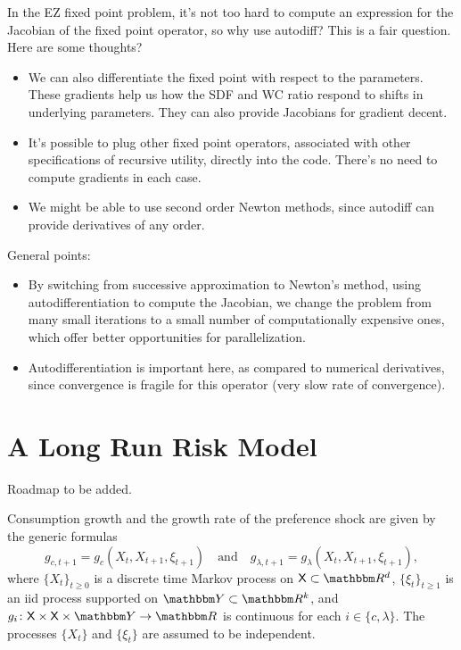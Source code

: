 \documentclass[12pt, reqno]{amsart}
\renewcommand{\geq}{\geqslant}
\newcommand{\1}{\mathbbm 1}
\newcommand{\RR}{\mathbbm R}
\newcommand{\YY}{\mathbbm Y}
\newcommand{\XX}{\mathsf X}
\theoremstyle{plain}
\theoremstyle{definition}
\begin{document}
In the EZ fixed point problem, it's not too hard to compute an expression for
the Jacobian of the fixed point operator, so why use autodiff?  This is a fair
question.  Here are some thoughts?
%
\begin{itemize}
    \item We can also differentiate the fixed point with respect to the
        parameters. These gradients help us how the SDF and WC ratio respond
        to shifts in underlying parameters.  They can also provide Jacobians
        for gradient decent.
    \item It's possible to plug other fixed point operators, associated with
        other specifications of recursive utility, directly into the code.
        There's no need to compute gradients in each case.
    \item We might be able to use second order Newton methods, since autodiff
        can provide derivatives of any order.
\end{itemize}

General points:
%
\begin{itemize}
    \item By switching from successive approximation to Newton's method, using
        autodifferentiation to compute the Jacobian, we change the problem
        from many small iterations to a small number of computationally
        expensive ones, which offer better opportunities for parallelization. 
    \item Autodifferentiation is important here, as compared to numerical
        derivatives, since convergence is fragile for this operator (very slow
        rate of convergence).
\end{itemize}


\section{A Long Run Risk Model}

Roadmap to be added.

Consumption growth and the growth rate of the preference shock are given by
the generic formulas
%
\begin{equation}
    \label{eq:kappa}
    g_{c, t+1}
    = g_c(X_t, X_{t+1}, \xi_{t+1})
    \quad \text{and} \quad
    g_{\lambda, t+1}
    = g_\lambda(X_t, X_{t+1}, \xi_{t+1}),
\end{equation}
%
where $\{ X_t \}_{t \geq 0}$ is a discrete time Markov process on $\XX \subset \RR^d$, $\{
\xi_t \}_{t \geq 1}$ is an {\sc iid} process supported on $\YY \subset \RR^k$,
and $g_i \colon \XX \times \XX \times \YY \to \RR$ is continuous for
each $i \in \{c, \lambda\}$.  The processes $\{X_t\}$  and $\{\xi_t\}$ are
assumed to be independent.
\end{document}
